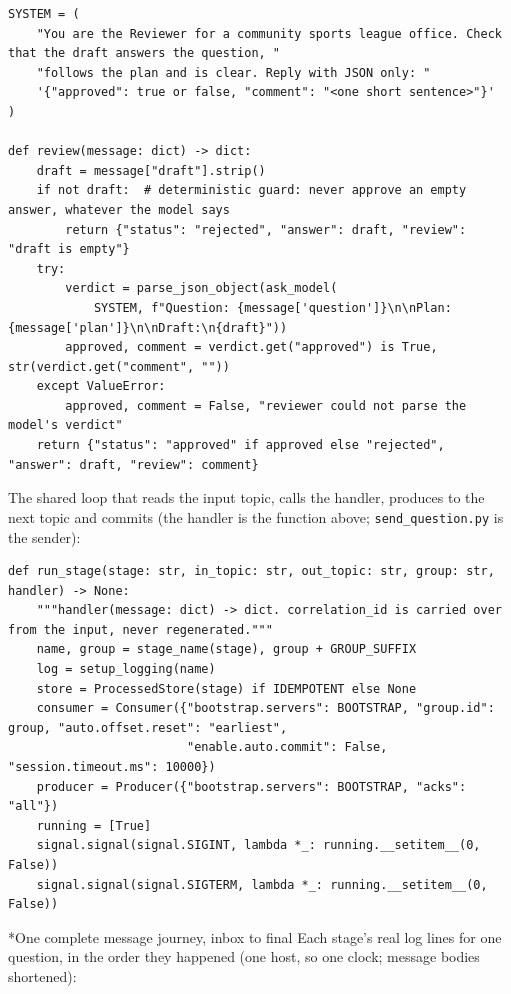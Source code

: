 \documentclass[11pt]{article}
\makeatletter
\renewcommand\subsection{\@startsection{subsection}{2}{\z@}{-2.2ex \@plus -1ex \@minus -.2ex}{0.8ex \@plus.2ex}{\normalfont\fontsize{12}{14.5}\selectfont\bfseries}}
\makeatother
\begin{document}
\begin{lstlisting}
SYSTEM = (
    "You are the Reviewer for a community sports league office. Check that the draft answers the question, "
    "follows the plan and is clear. Reply with JSON only: "
    '{"approved": true or false, "comment": "<one short sentence>"}'
)

def review(message: dict) -> dict:
    draft = message["draft"].strip()
    if not draft:  # deterministic guard: never approve an empty answer, whatever the model says
        return {"status": "rejected", "answer": draft, "review": "draft is empty"}
    try:
        verdict = parse_json_object(ask_model(
            SYSTEM, f"Question: {message['question']}\n\nPlan: {message['plan']}\n\nDraft:\n{draft}"))
        approved, comment = verdict.get("approved") is True, str(verdict.get("comment", ""))
    except ValueError:
        approved, comment = False, "reviewer could not parse the model's verdict"
    return {"status": "approved" if approved else "rejected", "answer": draft, "review": comment}
\end{lstlisting}
\endgroup
The shared loop that reads the input topic, calls the handler, produces to the next topic and commits (the handler is the function above; \texttt{send\_\allowbreak{}question.py} is the sender):

\begingroup\lstset{basicstyle=\ttfamily\tiny}
\begin{lstlisting}
def run_stage(stage: str, in_topic: str, out_topic: str, group: str, handler) -> None:
    """handler(message: dict) -> dict. correlation_id is carried over from the input, never regenerated."""
    name, group = stage_name(stage), group + GROUP_SUFFIX
    log = setup_logging(name)
    store = ProcessedStore(stage) if IDEMPOTENT else None
    consumer = Consumer({"bootstrap.servers": BOOTSTRAP, "group.id": group, "auto.offset.reset": "earliest",
                         "enable.auto.commit": False, "session.timeout.ms": 10000})
    producer = Producer({"bootstrap.servers": BOOTSTRAP, "acks": "all"})
    running = [True]
    signal.signal(signal.SIGINT, lambda *_: running.__setitem__(0, False))
    signal.signal(signal.SIGTERM, lambda *_: running.__setitem__(0, False))
\end{lstlisting}
\endgroup
\subsection*{One complete message journey, inbox to final}
Each stage's real log lines for one question, in the order they happened (one host, so one clock; message bodies shortened):
\end{document}
